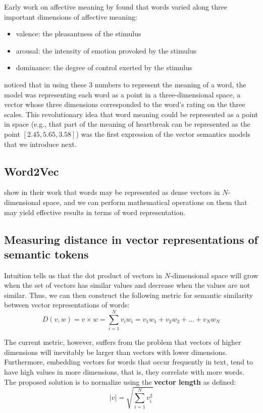 Early work on affective meaning by \cite{osgood1957measurement} found that words varied along three important dimensions of affective meaning:
\begin{itemize}
    \item valence: the pleasantness of the stimulus
    \item arousal: the intensity of emotion provoked by the stimulus
    \item dominance: the degree of control exerted by the stimulus
\end{itemize}

\cite{osgood1957measurement} noticed that in using these 3 numbers to represent the meaning of a word, the model was representing each word as a point in a three-dimensional space, a vector whose three dimensions corresponded to the word’s rating on the three scales. This revolutionary idea that word meaning could be represented as a point in space (e.g., that part of the meaning of heartbreak can be represented as the point $[2.45,5.65,3.58]$) was the first expression of the vector semantics models that we introduce next. 

\subsection*{Word2Vec}

\citet*{mikolov_word2vec_2013} show in their work that words may be represented as dense vectors in $N$-dimensional space, and we can perform mathematical operations on them that may yield effective results in terms of word representation. 

\subsection*{Measuring distance in vector representations of semantic tokens}
Intuition tells us that the dot product of vectors in $N$-dimensional space will grow when the set of vectors has similar values and decrease when the values are not similar. Thus, we can then construct the following metric for semantic similarity between vector representations of words:
$$ D(v,w) = v \times w = \sum_{i=1}^{N} v_i w_i = v_1 w_1 + v_2 w_2 + \dots + v_N w_N $$ 

The current metric, however, suffers from the problem that vectors of higher dimensions will inevitably be larger than vectors with lower dimensions. Furthermore, embedding vectors for words that occur frequently in text, tend to have high values in more dimensions, that is, they correlate with more words. The proposed solution is to normalize using the \textbf{vector length} as defined:
$$ | v| = \sqrt{\sum_{i=1}^{N}v_i^2}$$

